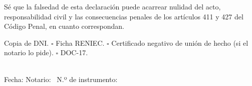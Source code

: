 \documentclass[12pt,a4paper]{article}
\begin{document}
Sé que la falsedad de esta declaración puede acarrear nulidad del acto, responsabilidad civil y las consecuencias penales de los artículos 411 y 427 del Código Penal, en cuanto correspondan.

Copia de DNI. $\square$ Ficha RENIEC. $\square$ Certificado negativo de unión de hecho (si el notario lo pide). $\square$ DOC-17.

\LugarFecha

\noindent
{}

\vspace{0.8em}
\\
{\small Fecha: \linea[3cm] \quad Notario: \NotarioNombre\ \quad N.º de instrumento: \linea[3.2cm]}\\[0.3em]
\noindent{}
\end{document}
